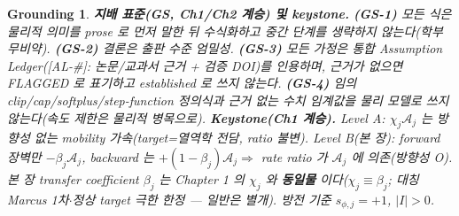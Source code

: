 \documentclass[11pt,a4paper]{article}
\newtheorem*{groundingbox}{Grounding}
\newcommand{\AL}[1]{\textsf{[AL-#1]}}
\begin{document}
\begin{groundingbox}
\textbf{지배 표준(GS, Ch1/Ch2 계승) 및 keystone.} \textbf{(GS-1)} 모든 식은 물리적 의미를 prose 로 먼저 말한 뒤
수식화하고 중간 단계를 생략하지 않는다(학부 무비약). \textbf{(GS-2)} 결론은 출판 수준 엄밀성. \textbf{(GS-3)} 모든
가정은 통합 Assumption Ledger(\AL{\#}: 논문/교과서 근거 + 검증 DOI)를 인용하며, 근거가 없으면 FLAGGED 로
표기하고 established 로 쓰지 않는다. \textbf{(GS-4)} 임의 clip/cap/softplus/step-function 정의식과 근거 없는
수치 임계값을 물리 모델로 쓰지 않는다(속도 제한은 물리적 병목으로). \textbf{Keystone(Ch1 계승).} Level A:
$\chi_j\mathcal A_j$ 는 \emph{방향성 없는} mobility 가속(target=열역학 전담, ratio 불변). Level B(본 장):
forward 장벽만 $-\beta_j\mathcal A_j$, backward 는 $+(1-\beta_j)\mathcal A_j\Rightarrow$ rate ratio 가
$\mathcal A_j$ 에 의존(방향성 O). 본 장 transfer coefficient $\beta_j$ 는 Chapter 1 의 $\chi_j$ 와 \textbf{동일물}
이다($\chi_j\equiv\beta_j$; \emph{대칭 Marcus 1차$\cdot$정상 target 극한 한정} — 일반은 별개). 방전 기준 $s_{\phi,j}=+1$, $|I|>0$.
\end{groundingbox}

\tableofcontents
\newpage

\end{document}
